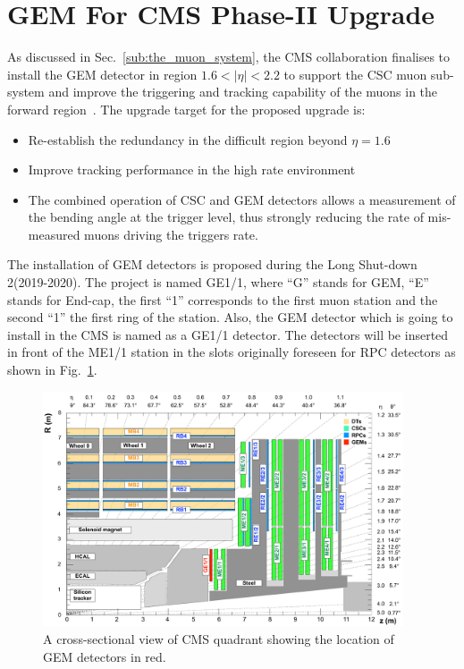 \section{GEM For CMS Phase-II Upgrade} %
\label{sec:gem_for_cms}
As discussed in Sec.~\ref{sub:the_muon_system},  the CMS collaboration finalises to install the GEM detector in region $1.6 < |\eta| < 2.2$ to support the CSC muon sub-system and improve the triggering and tracking capability of the muons in the forward region~\cite{Colaleo:2021453}. 
The upgrade target for the proposed upgrade is:
    \begin{itemize}
        \item Re-establish the redundancy in the difficult region beyond $\eta = 1.6 $
        \item Improve tracking performance in the high rate environment
        \item The combined operation of CSC and GEM detectors allows a measurement of the bending angle at the trigger level, thus strongly reducing the rate of mis-measured muons driving the triggers rate.
    \end{itemize}
The installation of GEM detectors is proposed during the Long Shut-down 2(2019-2020).
The project is named GE1/1, where ``G'' stands for GEM, ``E'' stands for End-cap, the first ``1'' corresponds to the first muon station and the second ``1'' the first ring of the station.
Also, the GEM detector which is going to install in the CMS is named as a GE1/1 detector.
The detectors will be inserted in front of the ME1/1 station in the slots originally foreseen for RPC detectors as shown in Fig.~\ref{fig:GE1/1pos}. 
\begin{figure}[!htbp]
    \centering
    \includegraphics[width=0.95\textwidth]{figures/GEM/cms_upg_o_g_b_ni_ge1_r_140227.pdf}
    \caption{A cross-sectional view of CMS quadrant showing the location of GEM detectors in red.}
    \label{fig:GE1/1pos}
\end{figure}

